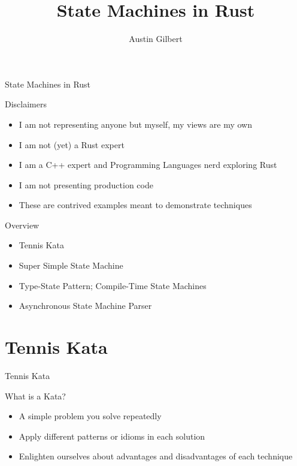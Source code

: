 \documentclass[aspectratio=169]{beamer}
\title{State Machines in Rust}
\author{Austin Gilbert}
\begin{document}
\begin{frame}
\begin{center}
\begin{Huge}
State Machines in Rust
\end{Huge}
\end{center}
\end{frame}

\begin{frame}{Disclaimers}
\begin{itemize}
\item I am not representing anyone but myself, my views are my own
\item I am not (yet) a Rust expert
\item I am a C++ expert and Programming Languages nerd exploring Rust
\item I am not presenting production code
\item These are contrived examples meant to demonstrate techniques
\end{itemize}
\end{frame}

\begin{frame}{Overview}
\begin{itemize}
\item Tennis Kata
\item Super Simple State Machine
\item Type-State Pattern; Compile-Time State Machines
\item Asynchronous State Machine Parser
\end{itemize}
\end{frame}

\section{Tennis Kata}
\begin{frame}
\begin{center}
\begin{Huge}
Tennis Kata
\end{Huge}
\end{center}
\end{frame}

\begin{frame}{What is a Kata?}
\begin{itemize}
\item A simple problem you solve repeatedly
\item Apply different patterns or idioms in each solution
\item Enlighten ourselves about advantages and disadvantages of each technique
\end{itemize}
\end{frame}
\end{document}
